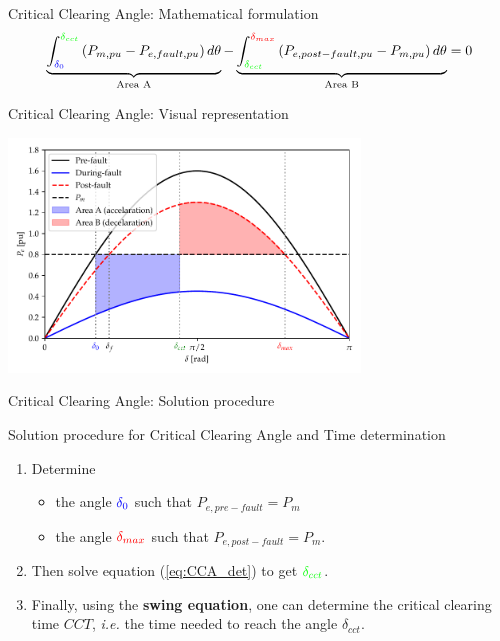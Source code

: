 \begin{frame}{Critical Clearing Angle: Mathematical formulation}
\begin{equation}
\underbrace{\int_{\mathcolor{blue}{\delta_0}}^{\mathcolor{green}{\delta_{cct}}} \left(P_{m,pu}-P_{e,fault,pu}\right) d\theta}_{\text{Area A}} - \underbrace{\int_{\mathcolor{green}{\delta_{cct}}}^{\mathcolor{red}{\delta_{max}}} \left(P_{e,post-fault,pu}-P_{m,pu}\right) d\theta}_{\text{Area B}} = 0  \label{eq:CCA_det}
\end{equation}
\end{frame}

\begin{frame}{Critical Clearing Angle:  Visual representation}


\begin{center}
\includegraphics[width=0.7\textwidth]{images/CCT_max.pdf}
\end{center}


\end{frame}

\begin{frame}{Critical Clearing Angle: Solution procedure}
\begin{block}{Solution procedure for Critical Clearing Angle and Time determination}
\begin{enumerate}
    \item Determine 
    \begin{itemize}
        \item the angle $\color{blue}{\delta_0}$ such that $P_{e,pre-fault} = P_{m}$
        \item the angle $\color{red}{\delta_{max}}$ such that $P_{e,post-fault} = P_{m}$. 
    \end{itemize}
    \item Then solve equation (\ref{eq:CCA_det}) to get $\color{green}{\delta_{cct}}$. 
    \item Finally, using the \textbf{swing equation}, one can determine the critical clearing time $CCT$, \emph{i.e.} the time needed to reach the angle $\delta_{cct}$.
\end{enumerate}
\end{block}

\end{frame}

